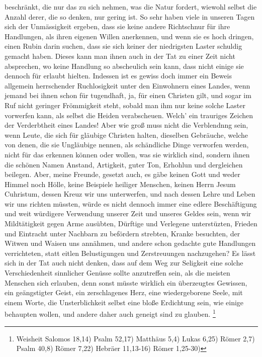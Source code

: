 beschränkt, die nur das zu sich nehmen, was die Natur fordert, wiewohl selbst
die Anzahl derer, die so denken, nur gering ist. So sehr haben viele in unseren
Tagen sich der Unmässigkeit ergeben, dass sie keine andere Richtschnur für ihre
Handlungen, als ihren eigenen Willen anerkennen, und wenn sie es hoch dringen,
einen Rubin darin suchen, dass sie sich keiner der niedrigsten Laster schuldig
gemacht haben. Dieses kann man ihnen auch in der Tat zu einer Zeit nicht
absprechen, wo keine Handlung so abscheulich sein kann, dass nicht einige sie
dennoch für erlaubt hielten. Indessen ist es gewiss doch immer ein Beweis
allgemein herrschender Ruchlosigkeit unter den Einwohnern eines Landes, wenn
jemand bei ihnen schon für tugendhaft, ja, für einen Christen gilt, und sogar im
Ruf nicht geringer Frömmigkeit steht, sobald man ihm nur keine solche Laster
vorwerfen kann, als selbst die Heiden verabscheuen. Welch' ein trauriges 
Zeichen
der Verderbtheit eines Landes! Aber wie groß muss 
nicht die Verblendnng sein,
wenn Leute, die sich für gläubige Christen halten, dieselben Gebräuche, welche
von denen, die sie Ungläubige nennen, als schändliche Dinge verworfen werden,
nicht für das erkennen können oder wollen, was sie wirklich sind, sondern ihnen
die schönen Namen Anstand, Artigkeit, guter Ton, Erhohlun und dergleichen beilegen.
Aber, meine Freunde, gesetzt auch, es gäbe keinen Gott und weder Himmel noch
Hölle, keine Beispiele heiliger Menschen, keinen Herrn Jesum Cuhristum, dessen
Kreuz wir uns unterwerfen, und nach dessen Lehre und Leben wir uns richten
müssten, würde es nicht dennoch immer eine edlere Beschäftigung und weit
würdigere Verwendung unserer Zeit und unseres Geldes sein, wenn wir
Mildtätigkeit gegen Arme ausübten, Dürftige und Verlegene unterstüzten,
Frieden und Eintracht unter Nachbarn zu befördern strebten, Kranke besuchten,
der Witwen und Waisen uns annähmen, und andere schon gedachte gute Handlungen
verrichteten, statt eitlen Belustigungen und Zerstreuungen nachzugehen? Es lässt
sich in der Tat auch nicht denken, dass auf dem Weg zur Seligkeit eine solche
Verschiedenheit sinnlicher Genüsse sollte anzutreffen sein, als die meisten
Menschen sich erlauben, denn sonst müsste wirklich ein überzeugtes Gewissen, ein
geängstigter Geist, ein zerschlagenes Herz, eine wiedergeborene Seele, mit
einem Worte, die Unsterblichkeit selbst eine bloße Erdichtung sein, wie einige
behaupten wollen, und andere daher auch geneigt sind zu glauben.
\footnote{Weisheit Salomos 18,14)
Psalm 52,17)
Matthäus 5,4)
Lukas 6,25)
Römer 2,7)
Psalm 40,8)
Römer 7,22)
Hebräer 11,13-16)
Römer 1,25-30)}
